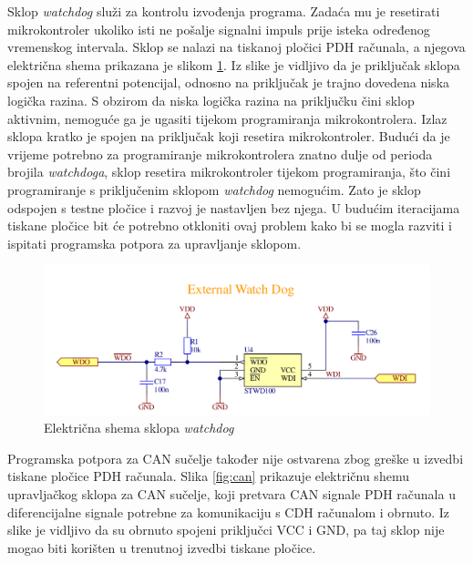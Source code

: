 Sklop \textit{watchdog} služi za kontrolu izvođenja programa. Zadaća mu je resetirati mikrokontroler ukoliko isti ne pošalje signalni impuls prije isteka određenog vremenskog intervala. Sklop se nalazi na tiskanoj pločici PDH računala, a njegova električna shema prikazana je slikom \ref{fig:watchdog}. Iz slike je vidljivo da je priključak  sklopa spojen na referentni potencijal, odnosno na priključak je trajno dovedena niska logička razina. S obzirom da niska logička razina na priključku  čini sklop aktivnim, nemoguće ga je ugasiti tijekom programiranja mikrokontrolera. Izlaz sklopa kratko je spojen na priključak koji resetira mikrokontroler. Budući da je vrijeme potrebno za programiranje mikrokontrolera znatno dulje od perioda brojila \textit{watchdoga}, sklop resetira mikrokontroler tijekom programiranja, što čini programiranje s priključenim sklopom \textit{watchdog} nemogućim. Zato je sklop odspojen s testne pločice i razvoj je nastavljen bez njega. U budućim iteracijama tiskane pločice bit će potrebno otkloniti ovaj problem kako bi se mogla razviti i ispitati programska potpora za upravljanje sklopom.

\begin{figure}[htb]
    \centering
    \includegraphics[width=\textwidth]{slike/watchdog.png}
    \caption{Električna shema sklopa \textit{watchdog} \cite{zavrsni_filip_juric}}
    \label{fig:watchdog}
\end{figure}

Programska potpora za CAN sučelje također nije ostvarena zbog greške u izvedbi tiskane pločice PDH računala. Slika \ref{fig:can} prikazuje električnu shemu upravljačkog sklopa za CAN sučelje, koji pretvara CAN signale PDH računala u diferencijalne signale potrebne za komunikaciju s CDH računalom i obrnuto. Iz slike je vidljivo da su obrnuto spojeni priključci VCC i GND, pa taj sklop nije mogao biti korišten u trenutnoj izvedbi tiskane pločice.


